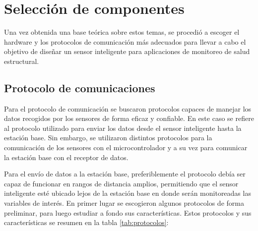 \section{Selección de componentes}
\label{sec:componentes}

Una vez obtenida una base teórica sobre estos temas, se procedió a escoger el hardware y los protocolos de comunicación más adecuados para llevar a cabo el objetivo de diseñar un sensor inteligente para aplicaciones de monitoreo de salud estructural. 
	

\subsection{Protocolo de comunicaciones}

Para el protocolo de comunicación se buscaron protocolos capaces de manejar los datos recogidos por los sensores de forma eficaz y confiable. En este caso se refiere al protocolo utilizado para enviar los datos desde el sensor inteligente hasta la estación base. Sin embargo, se utilizaron distintos protocolos para la comunicación de los sensores con el microcontrolador y a su vez para comunicar la estación base con el receptor de datos.
	
Para el envío de datos a la estación base, preferiblemente el protocolo debía ser capaz de funcionar en rangos de distancia amplios, permitiendo que el sensor inteligente esté ubicado lejos de la estación base en donde serán monitoreadas las variables de interés. En primer lugar se escogieron algunos protocolos de forma preliminar, para luego estudiar a fondo sus características. Estos protocolos y sus características se resumen en la tabla \ref{tab:protocolos}:

\begin{table}[H]
    \centering
    \caption{Comparación entre protocolos de comunicación inalámbrica, \citep{IoTCompare} y \citep{LPWANCompare}}
    \label{tab:protocolos}
\end{table}

